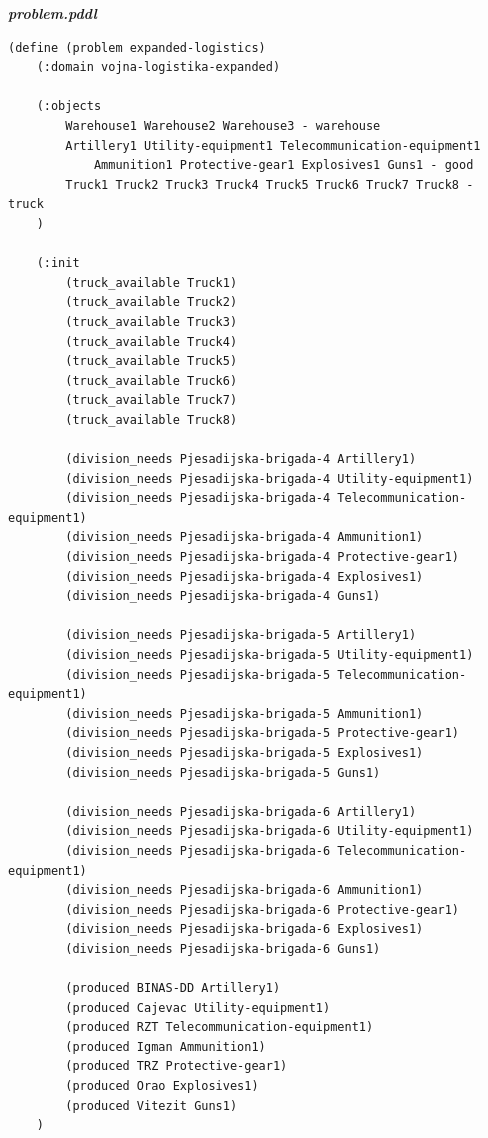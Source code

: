 \documentclass{article}
\begin{document}
\noindent\textbf{\textit{problem.pddl}}
\begin{verbatim}
(define (problem expanded-logistics)
    (:domain vojna-logistika-expanded)

    (:objects
        Warehouse1 Warehouse2 Warehouse3 - warehouse
        Artillery1 Utility-equipment1 Telecommunication-equipment1 
            Ammunition1 Protective-gear1 Explosives1 Guns1 - good
        Truck1 Truck2 Truck3 Truck4 Truck5 Truck6 Truck7 Truck8 - truck
    )

    (:init
        (truck_available Truck1)
        (truck_available Truck2)
        (truck_available Truck3)
        (truck_available Truck4)
        (truck_available Truck5)
        (truck_available Truck6)
        (truck_available Truck7)
        (truck_available Truck8)

        (division_needs Pjesadijska-brigada-4 Artillery1)
        (division_needs Pjesadijska-brigada-4 Utility-equipment1)
        (division_needs Pjesadijska-brigada-4 Telecommunication-equipment1)
        (division_needs Pjesadijska-brigada-4 Ammunition1)
        (division_needs Pjesadijska-brigada-4 Protective-gear1)
        (division_needs Pjesadijska-brigada-4 Explosives1)
        (division_needs Pjesadijska-brigada-4 Guns1)
        
        (division_needs Pjesadijska-brigada-5 Artillery1)
        (division_needs Pjesadijska-brigada-5 Utility-equipment1)
        (division_needs Pjesadijska-brigada-5 Telecommunication-equipment1)
        (division_needs Pjesadijska-brigada-5 Ammunition1)
        (division_needs Pjesadijska-brigada-5 Protective-gear1)
        (division_needs Pjesadijska-brigada-5 Explosives1)
        (division_needs Pjesadijska-brigada-5 Guns1)
        
        (division_needs Pjesadijska-brigada-6 Artillery1)
        (division_needs Pjesadijska-brigada-6 Utility-equipment1)
        (division_needs Pjesadijska-brigada-6 Telecommunication-equipment1)
        (division_needs Pjesadijska-brigada-6 Ammunition1)
        (division_needs Pjesadijska-brigada-6 Protective-gear1)
        (division_needs Pjesadijska-brigada-6 Explosives1)
        (division_needs Pjesadijska-brigada-6 Guns1)

        (produced BINAS-DD Artillery1)
        (produced Cajevac Utility-equipment1)
        (produced RZT Telecommunication-equipment1)
        (produced Igman Ammunition1)
        (produced TRZ Protective-gear1)
        (produced Orao Explosives1)
        (produced Vitezit Guns1)
    )


\end{verbatim}
\end{document}

